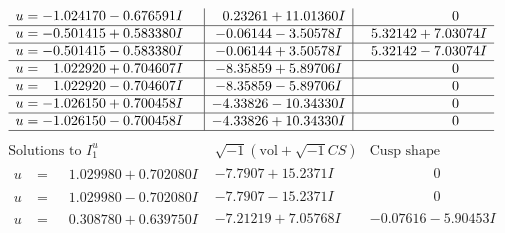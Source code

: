 \documentclass[1p]{elsarticle_modified}
\theoremstyle{definition}
\newcommand{\I}{\sqrt{-1}}
\begin{document}
$$\begin{array}{c|c|c}
\begin{aligned}
u &= -1.024170 - 0.676591 I\end{aligned}
 & \phantom{-}0.23261 + 11.01360 I & \phantom{-0.000000 } 0 \\ \hline\begin{aligned}
u &= -0.501415 + 0.583380 I\end{aligned}
 & -0.06144 - 3.50578 I & \phantom{-}5.32142 + 7.03074 I \\ \hline\begin{aligned}
u &= -0.501415 - 0.583380 I\end{aligned}
 & -0.06144 + 3.50578 I & \phantom{-}5.32142 - 7.03074 I \\ \hline\begin{aligned}
u &= \phantom{-}1.022920 + 0.704607 I\end{aligned}
 & -8.35859 + 5.89706 I & \phantom{-0.000000 } 0 \\ \hline\begin{aligned}
u &= \phantom{-}1.022920 - 0.704607 I\end{aligned}
 & -8.35859 - 5.89706 I & \phantom{-0.000000 } 0 \\ \hline\begin{aligned}
u &= -1.026150 + 0.700458 I\end{aligned}
 & -4.33826 - 10.34330 I & \phantom{-0.000000 } 0 \\ \hline\begin{aligned}
u &= -1.026150 - 0.700458 I\end{aligned}
 & -4.33826 + 10.34330 I & \phantom{-0.000000 } 0\\
 \hline 
 \end{array}$$\newpage$$\begin{array}{c|c|c}  
\text{Solutions to }I^u_{1}& \I (\text{vol} + \sqrt{-1}CS) & \text{Cusp shape}\\
 \hline 
\begin{aligned}
u &= \phantom{-}1.029980 + 0.702080 I\end{aligned}
 & -7.7907 + 15.2371 I & \phantom{-0.000000 } 0 \\ \hline\begin{aligned}
u &= \phantom{-}1.029980 - 0.702080 I\end{aligned}
 & -7.7907 - 15.2371 I & \phantom{-0.000000 } 0 \\ \hline\begin{aligned}
u &= \phantom{-}0.308780 + 0.639750 I\end{aligned}
 & -7.21219 + 7.05768 I & -0.07616 - 5.90453 I \\ \hline\begin{aligned}

\end{aligned}
\end{array}$$
\end{document}
